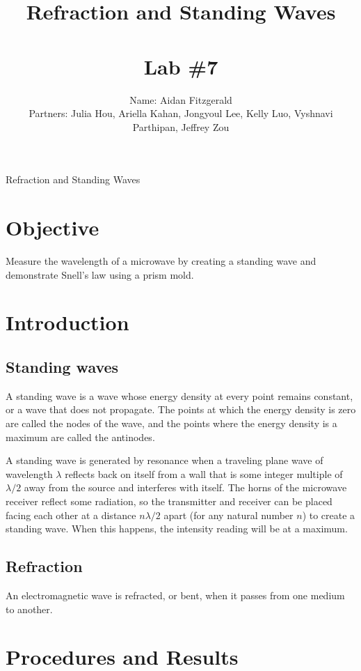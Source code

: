 \documentclass[11pt, titlepage, letterpaper, twoside]{article}
\title{\textbf{Refraction and Standing Waves} \\ \ \\ \large Lab \#7 }
\author{Name: Aidan Fitzgerald \\ Partners: Julia Hou, Ariella Kahan, Jongyoul Lee, Kelly Luo, Vyshnavi Parthipan, Jeffrey Zou}
\date{}
\begin{document}
\maketitle

\begin{center}
\LARGE Refraction and Standing Waves
\end{center}

\section*{Objective}

Measure the wavelength of a microwave by creating a standing wave and demonstrate Snell's law using a prism mold.

\section{Introduction}

\subsection{Standing waves}

A standing wave is a wave whose energy density at every point remains constant, or a wave that does not propagate.
The points at which the energy density is zero are called the nodes of the wave, and the points where the energy
density is a maximum are called the antinodes.

A standing wave is generated by resonance when a traveling plane wave of wavelength $\lambda$ reflects back on itself
from a wall that is some integer multiple of $\lambda/2$ away from the source and interferes with itself. The horns
of the microwave receiver reflect some radiation, so the transmitter and receiver can be placed facing each other at
a distance $n\lambda/2$ apart (for any natural number $n$) to create a standing wave. When this happens, the intensity
reading will be at a maximum.

\subsection{Refraction}

An electromagnetic wave is refracted, or bent, when it passes from one medium to another.

\section{Procedures and Results}
\end{document}
